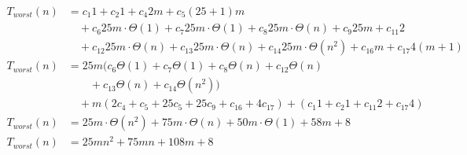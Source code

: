 \begin{subequations}
\label{eq:findlinesegments-7}
\begin{align}
\label{eq:findlinesegments-7-1}
T_{worst}(n)& =
c_{1}1
+ c_{2}1
+ c_{4}2m
+ c_{5}(25 + 1)m
\\
& \quad
+ c_{6}25m \cdot \Theta(1)
+ c_{7}25m \cdot \Theta(1)
+ c_{8}25m \cdot \Theta(n)
+ c_{9}25m
+ c_{11}2
\nonumber \\
& \quad
+ c_{12}25m \cdot \Theta(n)
+ c_{13}25m \cdot \Theta(n)
+ c_{14}25m \cdot \Theta(n^2)
+ c_{16}m
+ c_{17}4(m+1)
\nonumber \\
\label{eq:findlinesegments-7-2}
T_{worst}(n)& =
25m(c_{6} \Theta(1) + c_{7} \Theta(1) + c_{8} \Theta(n) + c_{12} \Theta(n)
\\
& \quad \quad
+ c_{13} \Theta(n) + c_{14} \Theta(n^2))
\nonumber \\
& \quad
+ m(2c_{4} + c_{5} + 25c_{5} + 25c_{9} + c_{16} + 4c_{17})
+ (c_{1}1 + c_{2}1 + c_{11}2 + c_{17}4)
\nonumber \\
\label{eq:findlinesegments-7-3}
T_{worst}(n)& =
25m \cdot \Theta(n^2) + 75m  \cdot \Theta(n) + 50m  \cdot \Theta(1) + 58m + 8
\\
\label{eq:findlinesegments-7-4}
T_{worst}(n)& =
25mn^2 + 75mn + 108m + 8
% 
\end{align}
\end{subequations}
